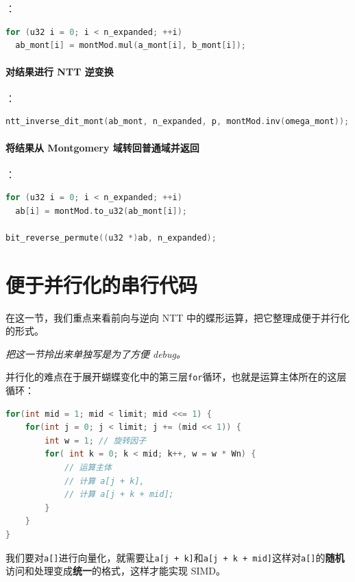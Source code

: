 \documentclass[a4paper]{article}
\begin{document}
：

\begin{lstlisting}[language=C++]
for (u32 i = 0; i < n_expanded; ++i)
  ab_mont[i] = montMod.mul(a_mont[i], b_mont[i]);
\end{lstlisting}

\paragraph{对结果进行 NTT 逆变换}

：

\begin{lstlisting}[language=C++]
ntt_inverse_dit_mont(ab_mont, n_expanded, p, montMod.inv(omega_mont));
\end{lstlisting}

\paragraph{将结果从 Montgomery 域转回普通域并返回}

：

\begin{lstlisting}[language=C++]
for (u32 i = 0; i < n_expanded; ++i)
  ab[i] = montMod.to_u32(ab_mont[i]);

bit_reverse_permute((u32 *)ab, n_expanded);
\end{lstlisting}

\section{便于并行化的串行代码}

在这一节，我们重点来看前向与逆向 NTT 中的蝶形运算，把它整理成便于并行化的形式。

\textit{把这一节拎出来单独写是为了方便 debug。}

并行化的难点在于展开蝴蝶变化中的第三层\texttt{for}循环，也就是运算主体所在的这层循环：

\begin{lstlisting}[language=C++]
for(int mid = 1; mid < limit; mid <<= 1) {
    for(int j = 0; j < limit; j += (mid << 1)) {
        int w = 1; // 旋转因子
        for( int k = 0; k < mid; k++, w = w * Wn) {
            // 运算主体
            // 计算 a[j + k],
            // 计算 a[j + k + mid];
        }
    }
}
\end{lstlisting}

我们要对\texttt{a[]}进行向量化，就需要让\texttt{a[j + k]}和\texttt{a[j + k + mid]}这样对\texttt{a[]}的\textbf{随机}访问和处理变成\textbf{统一}的格式，这样才能实现 SIMD。
\end{document}
